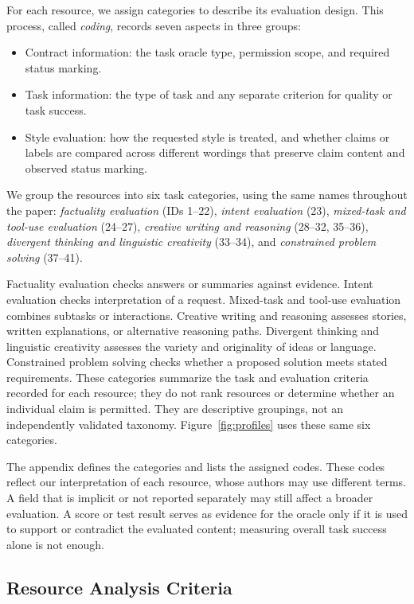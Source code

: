 \documentclass{clv2025}
\begin{document}
For each resource, we assign categories to describe its evaluation design.
This process, called \emph{coding}, records seven aspects in three groups:
\begin{itemize}
\item Contract information: the task oracle type, permission scope, and required
status marking.
\item Task information: the type of task and any separate criterion for
quality or task success.
\item Style evaluation: how the requested style is treated, and whether
claims or labels are compared across different wordings that preserve claim
content and observed status marking.
\end{itemize}
We group the resources into six task categories, using the same names
throughout the paper: \emph{factuality evaluation} (IDs 1--22),
\emph{intent evaluation} (23), \emph{mixed-task and tool-use evaluation}
(24--27), \emph{creative writing and reasoning} (28--32, 35--36),
\emph{divergent thinking and linguistic creativity} (33--34), and
\emph{constrained problem solving} (37--41).

Factuality evaluation checks answers or summaries against evidence. Intent
evaluation checks interpretation of a request. Mixed-task and tool-use
evaluation combines subtasks or interactions. Creative writing and reasoning
assesses stories, written explanations, or alternative reasoning paths.
Divergent thinking and linguistic creativity assesses the variety and
originality of ideas or language. Constrained problem solving checks whether
a proposed solution meets stated requirements. These categories summarize
the task and evaluation criteria recorded for each resource; they do not
rank resources or determine whether an individual claim is permitted.
They are descriptive groupings, not an independently validated taxonomy.
Figure~\ref{fig:profiles} uses these same six categories.

The appendix defines the categories and lists the assigned codes. These
codes reflect our interpretation of each resource, whose authors may use
different terms. A field that is implicit or not reported separately may
still affect a broader evaluation. A score or test result serves as evidence
for the oracle only if it is used to support or contradict the evaluated
content; measuring overall task success alone is not enough.

\subsection{Resource Analysis Criteria}\label{sec:mapping}
\end{document}
